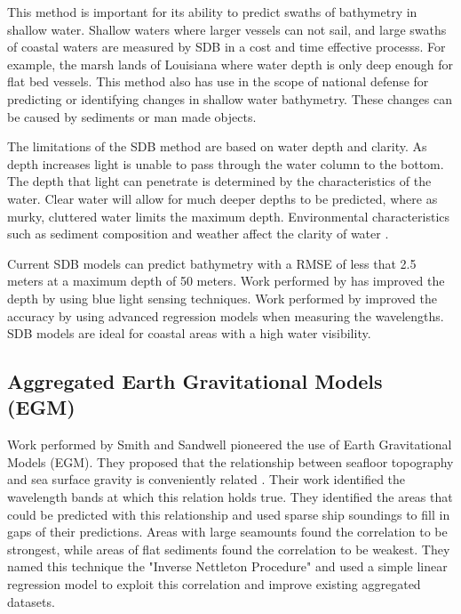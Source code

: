 \par
This method is important for its ability to predict swaths of bathymetry in shallow water.
Shallow waters where larger vessels can not sail, and large swaths of coastal waters are measured by \ac{SDB} in a cost and time effective processs.
For example, the marsh lands of Louisiana where water depth is only deep enough for flat bed vessels.
This method also has use in the scope of national defense for predicting or identifying changes in shallow water bathymetry.
These changes can be caused by sediments or man made objects. 

\par
The limitations of the \ac{SDB} method are based on water depth and clarity.
As depth increases light is unable to pass through the water column to the bottom.
The depth that light can penetrate is determined by the characteristics of the water.
Clear water will allow for much deeper depths to be predicted, where as murky, cluttered water limits the maximum depth.
Environmental characteristics such as sediment composition and weather affect the clarity of water \cite{vinayaraj2016satellite}.

\par
Current \ac{SDB} models can predict bathymetry with a \ac{RMSE} of less that 2.5 meters at a maximum depth of 50 meters.
Work performed by \cite{vinayaraj2016satellite} has improved the depth by using blue light sensing techniques.
Work performed by \cite{chybicki2018three} improved the accuracy by using advanced regression models when measuring the wavelengths.
\ac{SDB} models are ideal for coastal areas with a high water visibility.

\subsection{Aggregated Earth Gravitational Models (EGM)}
Work performed by Smith and Sandwell \cite{smith1994bathymetric}\cite{smith1997global} pioneered the use of Earth Gravitational Models (EGM).
They proposed that the relationship between seafloor topography and sea surface gravity is conveniently related \cite{smith1994bathymetric}.
Their work identified the wavelength bands at which this relation holds true.
They identified the areas that could be predicted with this relationship and used sparse ship soundings to fill in gaps of their predictions.
Areas with large seamounts found the correlation to be strongest, while areas of flat sediments found the correlation to be weakest.
They named this technique the "Inverse Nettleton Procedure" and used a simple linear regression model to exploit this correlation and improve existing aggregated datasets.

